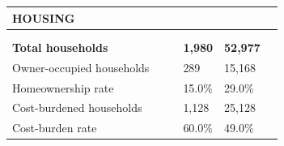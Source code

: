 \documentclass[9pt]{report}
\begin{document}
\vspace{12pt}
\setlength{\tabcolsep}{.01in} %
\begin{tabular}{p{.10in}p{.10in}p{.10in}p{3.7in}>{\hfill}p{.85in}>{\hfill}p{.85in}>{\hfill}p{.85in}>{\hfill}p{.85in}p{0.1in}}
\multicolumn{9}{l}{\parbox{7.1in}{\raggedright{\large{\strut\textbf{HOUSING}\strut}}}} \\ 
\hline
\multicolumn{4}{l}{\parbox{3.5in}{\raggedright{\textbf{}}}} & \multicolumn{1}{r}{\parbox{.85in}{\strut\raggedleft{\textbf{}\strut}}} & \multicolumn{1}{r}{\parbox{.85in}{\strut\raggedleft{\textbf{}\strut}}} & \multicolumn{1}{r}{\parbox{.85in}{\strut{}}} & \multicolumn{1}{r}{\parbox{.85in}{\strut{}}} & \\ 
\multicolumn{9}{l}{} \\ 
\multicolumn{4}{l}{\parbox{3.5in}{\strut\raggedright{\textbf{Total households}\strut}}} & \textbf{} & \textbf{} & \textbf{1,980} & \textbf{52,977} & \textbf{} \\ 
\multicolumn{4}{l}{\parbox{3.6in}{\strut\raggedright{{Owner-occupied households}}\strut}} &  &  & 289 & 15,168 & \multicolumn{1}{l}{}  \\ 
\multicolumn{4}{l}{\parbox{3.6in}{\strut\raggedright{{Homeownership rate}}\strut}} &  &  & 15.0\% & 29.0\% & \multicolumn{1}{l}{}  \\ 
\multicolumn{4}{l}{\parbox{3.6in}{\strut\raggedright{{Cost-burdened households}}\strut}} &  &  & 1,128 & 25,128 & \multicolumn{1}{l}{}  \\ 
\multicolumn{4}{l}{\parbox{3.6in}{\strut\raggedright{{Cost-burden rate}}\strut}} &  &  & 60.0\% & 49.0\% & \multicolumn{1}{l}{}  \\ 

\end{tabular}
\setlength{\tabcolsep}{6pt} %
\end{document}
